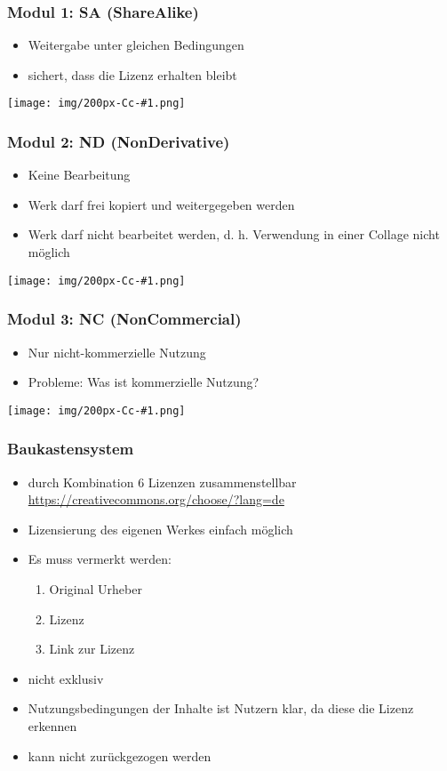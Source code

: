 \documentclass[table]{beamer}
\newcommand{\Cc}[1]{\begin{center}
    \texttt{[image: img/200px-Cc-\#1.png]}
\end{center}}
\begin{document}
\begin{frame}
    \frametitle{Modul 1: SA (ShareAlike)}
    \begin{itemize}
        \item Weitergabe unter gleichen Bedingungen
        \item sichert, dass die Lizenz erhalten bleibt
    \end{itemize}
    \Cc{sa}
\end{frame}

\begin{frame}
    \frametitle{Modul 2: ND (NonDerivative)}
    \begin{itemize}
        \item Keine Bearbeitung
        \item Werk darf frei kopiert und weitergegeben werden
        \item Werk darf nicht bearbeitet werden, d. h. Verwendung in einer Collage nicht möglich
    \end{itemize}
    \Cc{nd}
\end{frame}

\begin{frame}
    \frametitle{Modul 3: NC (NonCommercial)}
    \begin{itemize}
        \item Nur nicht-kommerzielle Nutzung
        \item Probleme: Was ist kommerzielle Nutzung?
    \end{itemize}
    \Cc{nc}
\end{frame}


\begin{frame}
    \frametitle{Baukastensystem}
    \begin{itemize}
        \item<2-> durch Kombination 6 Lizenzen zusammenstellbar
            \url{https://creativecommons.org/choose/?lang=de}
        \item<3-> Lizensierung des eigenen Werkes einfach möglich
        \item<4-> Es muss vermerkt werden:
            \begin{enumerate}
                \item<5-> Original Urheber
                \item<6-> Lizenz
                \item<7-> Link zur Lizenz
            \end{enumerate}
        \item<8-> nicht exklusiv
        \item<9-> Nutzungsbedingungen der Inhalte ist Nutzern klar, da diese die Lizenz erkennen
        \item<10-> kann nicht zurückgezogen werden
    \end{itemize}
\end{frame}
\end{document}
